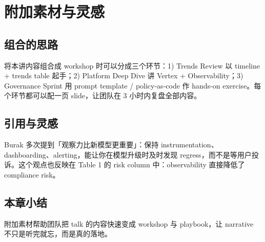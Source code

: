 \section{附加素材与灵感}

\subsection{组合的思路}

将本讲内容组合成 workshop 时可以分成三个环节：1) Trends Review 以 timeline + trends table 起手；2) Platform Deep Dive 讲 Vertex + Observability；3) Governance Sprint 用 prompt template / policy-as-code 作 hands-on exercise。每个环节都可以配一页 slide，让团队在 3 小时内复盘全部内容。

\subsection{引用与灵感}

Burak 多次提到「观察力比新模型更重要」：保持 instrumentation、dashboarding、alerting，能让你在模型升级时及时发现 regress，而不是等用户投诉。这个观点也反映在 Table 1 的 risk column 中：observability 直接降低了 compliance risk。

\subsection{本章小结}

附加素材帮助团队把 talk 的内容快速变成 workshop 与 playbook，让 narrative 不只是听完就忘，而是真的落地。

